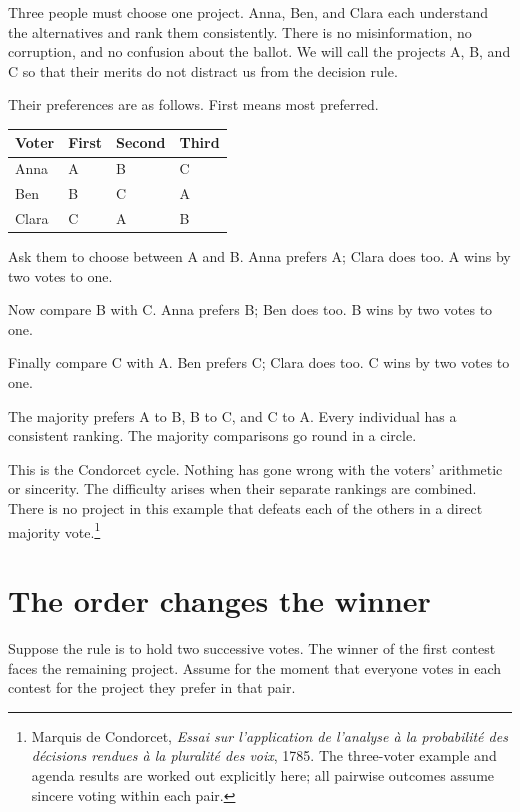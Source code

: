 \documentclass[12pt,a4paper]{book}
\begin{document}
Three people must choose one project. Anna, Ben, and Clara each understand the alternatives and rank them consistently. There is no misinformation, no corruption, and no confusion about the ballot. We will call the projects A, B, and C so that their merits do not distract us from the decision rule.

Their preferences are as follows. First means most preferred.

\begin{center}
\begin{tabular}{llll}
\toprule
Voter & First & Second & Third \\
\midrule
Anna & A & B & C \\
Ben & B & C & A \\
Clara & C & A & B \\
\bottomrule
\end{tabular}
\end{center}

Ask them to choose between A and B. Anna prefers A; Clara does too. A wins by two votes to one.

Now compare B with C. Anna prefers B; Ben does too. B wins by two votes to one.

Finally compare C with A. Ben prefers C; Clara does too. C wins by two votes to one.

The majority prefers A to B, B to C, and C to A. Every individual has a consistent ranking. The majority comparisons go round in a circle.

This is the Condorcet cycle. Nothing has gone wrong with the voters' arithmetic or sincerity. The difficulty arises when their separate rankings are combined. There is no project in this example that defeats each of the others in a direct majority vote.\footnote{Marquis de Condorcet, \emph{Essai sur l'application de l'analyse à la probabilité des décisions rendues à la pluralité des voix}, 1785. The three-voter example and agenda results are worked out explicitly here; all pairwise outcomes assume sincere voting within each pair.}

\section*{The order changes the winner}

Suppose the rule is to hold two successive votes. The winner of the first contest faces the remaining project. Assume for the moment that everyone votes in each contest for the project they prefer in that pair.
\end{document}
